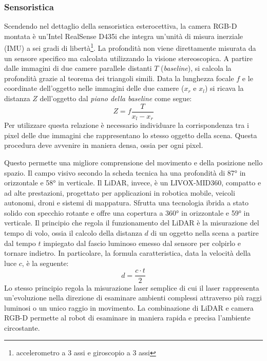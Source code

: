 \subsubsection{Sensoristica}
Scendendo nel dettaglio della sensoristica esterocettiva, la camera RGB-D montata è un'Intel RealSense D435i che integra un'unità di misura inerziale (IMU) a sei gradi di libertà\footnote{accelerometro a 3 assi e giroscopio a 3 assi}. La profondità non viene direttamente misurata da un sensore specifico ma calcolata utilizzando la visione stereoscopica. A partire dalle immagini di due camere parallele distanti $T$ (\textit{baseline}), si calcola la profondità grazie al teorema dei triangoli simili. Data la lunghezza focale $f$ e le coordinate dell'oggetto nelle immagini delle due camere ($x_r$ e $x_l$) si ricava la distanza $Z$ dell'oggetto dal \textit{piano della baseline} come segue:
\begin{equation}
    Z=f\frac{T}{x_l-x_r}
\end{equation}
Per utilizzare questa relazione è necessario individuare la corrispondenza tra i pixel delle due immagini che rappresentano lo stesso oggetto della scena. Questa procedura deve avvenire in maniera densa, ossia per ogni pixel. 

Questo permette una migliore comprensione del movimento e della posizione nello spazio. Il campo visivo secondo la scheda tecnica \cite{unitreeManual2025} ha una profondità di 87° in orizzontale e 58° in verticale. Il LiDAR, invece, è un LIVOX-MID360, compatto e ad alte prestazioni, progettato per applicazioni in robotica mobile, veicoli autonomi, droni e sistemi di mappatura. Sfrutta una tecnologia ibrida a stato solido con specchio rotante e offre una copertura a 360° in orizzontale e 59° in verticale. Il principio che regola il funzionamento del LiDAR è la misurazione del tempo di volo, ossia il calcolo della distanza $d$ di un oggetto nella scena a partire dal tempo $t$ impiegato dal fascio luminoso emesso dal sensore per colpirlo e tornare indietro. In particolare, la formula caratteristica, data la velocità della luce $c$, è la seguente:
\begin{equation}
    d = \frac{c\cdot t}{2}
\end{equation}
Lo stesso principio regola la misurazione laser semplice di cui il laser rappresenta un'evoluzione nella direzione di esaminare ambienti complessi attraverso più raggi luminosi o un unico raggio in movimento. La combinazione di LiDAR e camera RGB-D permette al robot di esaminare in maniera rapida e precisa l'ambiente circostante.


